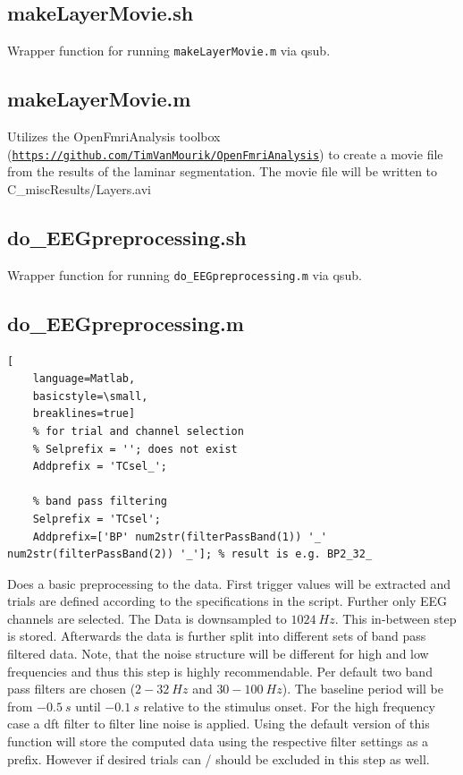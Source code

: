 \documentclass[12pt,a4paper]{scrartcl}
\begin{document}
\subsection{makeLayerMovie.sh}
Wrapper function for running \texttt{makeLayerMovie.m} via qsub.

\subsection{makeLayerMovie.m}
Utilizes the OpenFmriAnalysis toolbox (\href{https://github.com/TimVanMourik/OpenFmriAnalysis}{\nolinkurl{https://github.com/TimVanMourik/OpenFmriAnalysis}}) to create a movie file from the results of the laminar segmentation. The movie file will be written to C\_miscResults/Layers.avi

\subsection{do\_EEGpreprocessing.sh}
\label{sec:EEGpreproc}
Wrapper function for running \texttt{do\_EEGpreprocessing.m} via qsub.

\subsection{do\_EEGpreprocessing.m}
\begin{lstlisting}[
    language=Matlab,
    basicstyle=\small,
    breaklines=true]
    % for trial and channel selection
    % Selprefix = ''; does not exist
    Addprefix = 'TCsel_';

    % band pass filtering
    Selprefix = 'TCsel';
    Addprefix=['BP' num2str(filterPassBand(1)) '_' num2str(filterPassBand(2)) '_']; % result is e.g. BP2_32_
\end{lstlisting}
Does a basic preprocessing to the data. First trigger values will be extracted and trials are defined according to the specifications in the script. Further only EEG channels are selected. The Data is downsampled to $1024~Hz$. This in-between step is stored. Afterwards the data is further split into different sets of band pass filtered data. Note, that the noise structure will be different for high and low frequencies and thus this step is highly recommendable. Per default two band pass filters are chosen ($2-32~Hz$ and $30-100~Hz$). The baseline period will be from $-0.5~s$ until $-0.1~s$ relative to the stimulus onset. For the high frequency case a dft filter to filter line noise is applied. Using the default version of this function will store the computed data using the respective filter settings as a prefix. However if desired trials can / should be excluded in this step as well.\\
\end{document}
